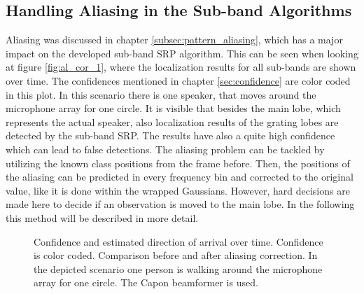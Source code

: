 \subsection{Handling Aliasing in the Sub-band Algorithms}

Aliasing was discussed in chapter \ref{subsec:pattern_aliasing}, which has a major impact on the developed sub-band SRP algorithm. This can be seen when looking at figure \ref{fig:al_cor_1}, where the localization results for all sub-bands are shown over time. The confidences mentioned in chapter \ref{sec:confidence} are color coded in this plot. In this scenario there is one speaker, that moves around the microphone array for one circle. It is visible that besides the main lobe, which represents the actual speaker, also localization results of the grating lobes are detected by the sub-band SRP. The results have also a quite high confidence which can lead to false detections. The aliasing problem can be tackled by utilizing the known class positions from the frame before. Then, the positions of the aliasing can be predicted in every frequency bin and corrected to the original value, like it is done within the wrapped Gaussians. However, hard decisions are made here to decide if an observation is moved to the main lobe. In the following this method will be described in more detail.\\

\begin{figure}[!ht]
	\hfill
	\caption{Confidence and estimated direction of arrival over time. Confidence is color coded. Comparison before and after aliasing correction. In the depicted scenario one person is walking around the microphone array for one circle. The Capon beamformer is used.}
	\label{fig:al_cor}
\end{figure}

